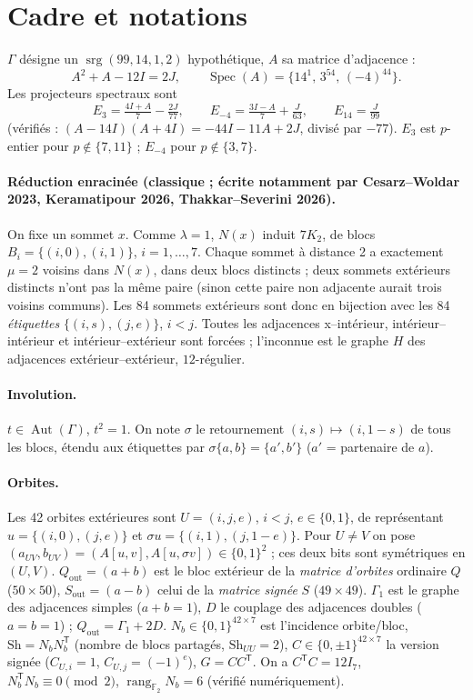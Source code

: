 \documentclass[11pt,a4paper]{article}
\theoremstyle{definition}
\theoremstyle{remark}
\newcommand{\F}{\mathbb{F}}
\newcommand{\rg}{\operatorname{rang}}
\newcommand{\srg}{\operatorname{srg}}
\newcommand{\Aut}{\operatorname{Aut}}
\newcommand{\Spec}{\operatorname{Spec}}
\newcommand{\Sh}{\mathrm{Sh}}
\newcommand{\Sout}{S_{\mathrm{out}}}
\newcommand{\Qout}{Q_{\mathrm{out}}}
\begin{document}
\section{Cadre et notations}\label{sec:notations}
$\Gamma$ désigne un $\srg(99,14,1,2)$ hypothétique, $A$ sa matrice d'adjacence :
\[A^2+A-12I=2J,\qquad \Spec(A)=\{14^1,\,3^{54},\,(-4)^{44}\}.\]
Les projecteurs spectraux sont
\[E_3=\tfrac{4I+A}{7}-\tfrac{2J}{77},\qquad E_{-4}=\tfrac{3I-A}{7}+\tfrac{J}{63},\qquad E_{14}=\tfrac{J}{99}\]
(vérifiés : $(A-14I)(A+4I)=-44I-11A+2J$, divisé par $-77$). $E_3$ est $p$-entier pour $p\notin\{7,11\}$ ; $E_{-4}$ pour $p\notin\{3,7\}$.

\paragraph{Réduction enracinée (classique ; écrite notamment par Cesarz--Woldar 2023, Keramatipour 2026, Thakkar--Severini 2026).} On fixe un sommet $x$. Comme $\lambda=1$, $N(x)$ induit $7K_2$, de blocs $B_i=\{(i,0),(i,1)\}$, $i=1,\dots,7$.
Chaque sommet à distance 2 a exactement $\mu=2$ voisins dans $N(x)$, dans deux blocs distincts ; deux sommets extérieurs distincts n'ont pas la même paire
(sinon cette paire non adjacente aurait trois voisins communs). Les 84 sommets extérieurs sont donc en bijection avec les 84 \emph{étiquettes}
$\{(i,s),(j,e)\}$, $i<j$. Toutes les adjacences x--intérieur, intérieur--intérieur et intérieur--extérieur sont forcées ; l'inconnue est le graphe $H$ des adjacences
extérieur--extérieur, $12$-régulier.

\paragraph{Involution.} $t\in\Aut(\Gamma)$, $t^2=1$. On note $\sigma$ le retournement $(i,s)\mapsto(i,1-s)$ de tous les blocs, étendu aux étiquettes par
$\sigma\{a,b\}=\{a',b'\}$ ($a'$ = partenaire de $a$).

\paragraph{Orbites.} Les 42 orbites extérieures sont $U=(i,j,e)$, $i<j$, $e\in\{0,1\}$, de représentant $u=\{(i,0),(j,e)\}$ et $\sigma u=\{(i,1),(j,1-e)\}$.
Pour $U\neq V$ on pose $(a_{UV},b_{UV})=(A[u,v],A[u,\sigma v])\in\{0,1\}^2$ ; ces deux bits sont symétriques en $(U,V)$.
$\Qout=(a+b)$ est le bloc extérieur de la \emph{matrice d'orbites} ordinaire $Q$ ($50\times50$), $\Sout=(a-b)$ celui de la \emph{matrice signée} $S$ ($49\times49$).
$\Gamma_1$ est le graphe des adjacences simples ($a+b=1$), $D$ le couplage des adjacences doubles ($a=b=1$) ; $\Qout=\Gamma_1+2D$.
$N_b\in\{0,1\}^{42\times7}$ est l'incidence orbite/bloc, $\Sh=N_bN_b^{\mathsf T}$ (nombre de blocs partagés, $\Sh_{UU}=2$),
$C\in\{0,\pm1\}^{42\times7}$ la version signée ($C_{U,i}=1$, $C_{U,j}=(-1)^e$), $G=CC^{\mathsf T}$.
On a $C^{\mathsf T}C=12I_7$, $N_b^{\mathsf T}N_b\equiv0\pmod2$, $\rg_{\F_2}N_b=6$ (vérifié numériquement).
\end{document}

